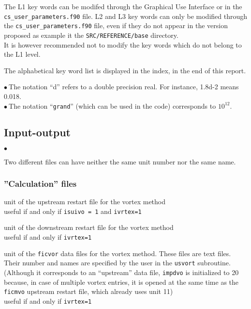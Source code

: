 The L1 key words can be modifed through the Graphical Use Interface or
in the \texttt{cs\_user\_parameters.f90} file. L2 and L3 key words can only be modified through
the \texttt{cs\_user\_parameters.f90} file, even if they do not appear in the version proposed
as example it the \texttt{SRC/REFERENCE/base} directory.\\
It is however recommended not to modify the key words which do not belong to the L1
level.

The alphabetical key word list is displayed in the index, in the end of
this report.

$\bullet\ $The notation ``d'' refers to a double precision real. For
           instance, 1.8d-2 means 0.018. \\
$\bullet\ $The notation ``{\tt grand}'' (which can be used in the code)
corresponds to $10^{12}$.

\subsection{Input-output}

\begin{list}{$\bullet$}{}
\item Two different files can have neither the same unit number nor the
      same name.
\end{list}

\subsubsection{''Calculation'' files}




{unit of the upstream restart file for the vortex method\\
useful if and only if {\tt isuivo = 1} and {\tt ivrtex=1}}

{unit of the downstream restart file for the vortex method\\
useful if and only if {\tt ivrtex=1}}

{unit of the {\tt ficvor} data files for the vortex method. These
files are text files. Their number and names are specified by the user in
the \texttt{usvort} subroutine.\\
(Although it corresponds to an ``upstream'' data file, {\tt impdvo} is
initialized to 20 because, in case of multiple vortex entries,
it is opened at the same time as the {\tt ficmvo} upstream restart file,
which already uses unit 11)\\
useful if and only if {\tt ivrtex=1}}


